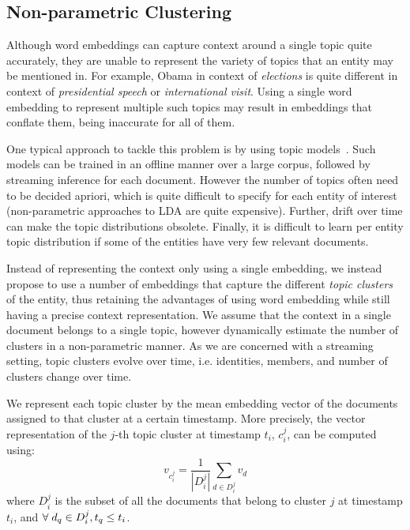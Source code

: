 \documentclass{article}
\begin{document}
\subsection{Non-parametric Clustering}
\label{non}

Although word embeddings can capture context around a single topic quite accurately, they are unable to represent the variety of topics that an entity may be mentioned in.
For example, Obama in context of \emph{elections} is quite different in context of \emph{presidential speech} or \emph{international visit}.
Using a single word embedding to represent multiple such topics may result in embeddings that conflate them, being inaccurate for all of them.

One typical approach to tackle this problem is by using topic models~\cite{blei12}.
Such models can be trained in an offline manner over a large corpus, followed by streaming inference for each document.
However the number of topics often need to be decided apriori, which is quite difficult to specify for each entity of interest (non-parametric approaches to LDA are quite expensive).
Further, drift over time can make the topic distributions obsolete.
Finally, it is difficult to learn per entity topic distribution if some of the entities have very few relevant documents.


Instead of representing the context only using a single embedding, we instead propose to use a number of embeddings that capture the different \emph{topic clusters} of the entity, thus retaining the advantages of using word embedding while still having a precise context representation.
We assume that the context in a single document belongs to a single topic, however dynamically estimate the number of clusters in a non-parametric manner. 
As we are concerned with a streaming setting, topic clusters evolve over time, i.e. identities, members, and number of clusters change over time. 

We represent each topic cluster by the mean embedding vector of the documents assigned to that cluster at a certain timestamp.
More precisely, the vector representation of the $j$-th topic cluster at timestamp $t_i$, $c^j_i$, can be computed using: %
\begin{equation}
\label{nonparamclust}
v_{c^j_i} = \frac{1}{|D^j_i|} \sum_{d \in D^j_i}{v_d}
\end{equation}
where $D^j_i$ is the subset of all the documents that belong to cluster $j$ at timestamp $t_i$, and $\forall\hspace{1mm}d_q \in D^j_i, t_q \leq t_i$.
\end{document}
